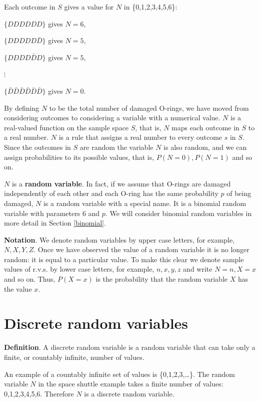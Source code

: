 \documentclass[
  british,
]{book}
\begin{document}
Each outcome in \(S\) gives a value for \(N\) in \{0,1,2,3,4,5,6\}:

\(\{DDDDDD\}\) gives \(N=6\),

\(\{DDDDD\bar{D}\}\) gives \(N=5\),

\(\{DDDD\bar{D}D\}\) gives \(N=5\),

\(\vdots\)

\(\{\bar{D}\bar{D}\bar{D}\bar{D}\bar{D}\bar{D}\}\) gives \(N=0\).

By defining \(N\) to be the total number of damaged O-rings, we have moved from considering outcomes to considering a variable with a numerical value. \(N\) is a real-valued function on the sample space \(S\), that is, \(N\) maps each outcome in \(S\) to a real number. \(N\) is a rule that assigns a real number to every outcome \(s\) in \(S\). Since the outcomes in \(S\) are random the variable \(N\) is also random, and we can assign probabilities to its possible values, that is, \(P(N=0), P(N=1)\) and so on.

\(N\) is a \textbf{random variable}. In fact, if we assume that O-rings are damaged independently of each other and each O-ring has the same probability \(p\) of being damaged, \(N\) is a random variable with a special name. It is a binomial random variable with parameters 6 and \(p\). We will consider binomial random variables in more detail in Section \ref{binomial}.

\textbf{Notation}. We denote random variables by upper case letters, for example, \(N, X, Y, Z\). Once we have observed the value of a random variable it is no longer random: it is equal to a particular value. To make this clear we denote sample values of r.v.s. by lower case letters, for example, \(n, x, y, z\) and write \(N=n, X=x\) and so on. Thus, \(P(X=x)\) is the probability that the random variable \(X\) has the value \(x\).

\hypertarget{discrete}{%
\section{Discrete random variables}\label{discrete}}

\textbf{Definition}. A discrete random variable is a random variable that can take only a finite, or countably infinite, number of values.

An example of a countably infinite set of values is \{0,1,2,3,\ldots\}. The random variable \(N\) in the space shuttle example takes a finite number of values: 0,1,2,3,4,5,6. Therefore \(N\) is a discrete random variable.
\end{document}
